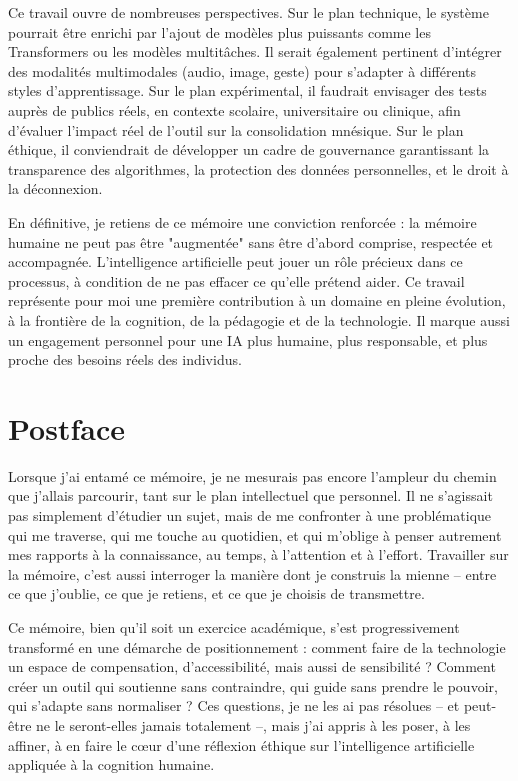 \documentclass[11pt,a4paper]{report}
\begin{document}
Ce travail ouvre de nombreuses perspectives. Sur le plan technique, le système pourrait être enrichi par l’ajout de modèles plus puissants comme les Transformers ou les modèles multitâches. Il serait également pertinent d’intégrer des modalités multimodales (audio, image, geste) pour s’adapter à différents styles d’apprentissage. Sur le plan expérimental, il faudrait envisager des tests auprès de publics réels, en contexte scolaire, universitaire ou clinique, afin d’évaluer l’impact réel de l’outil sur la consolidation mnésique. Sur le plan éthique, il conviendrait de développer un cadre de gouvernance garantissant la transparence des algorithmes, la protection des données personnelles, et le droit à la déconnexion.

En définitive, je retiens de ce mémoire une conviction renforcée : la mémoire humaine ne peut pas être "augmentée" sans être d’abord comprise, respectée et accompagnée. L’intelligence artificielle peut jouer un rôle précieux dans ce processus, à condition de ne pas effacer ce qu’elle prétend aider. Ce travail représente pour moi une première contribution à un domaine en pleine évolution, à la frontière de la cognition, de la pédagogie et de la technologie. Il marque aussi un engagement personnel pour une IA plus humaine, plus responsable, et plus proche des besoins réels des individus.

\chapter*{Postface}

Lorsque j’ai entamé ce mémoire, je ne mesurais pas encore l’ampleur du chemin que j’allais parcourir, tant sur le plan intellectuel que personnel. Il ne s’agissait pas simplement d’étudier un sujet, mais de me confronter à une problématique qui me traverse, qui me touche au quotidien, et qui m’oblige à penser autrement mes rapports à la connaissance, au temps, à l’attention et à l’effort. Travailler sur la mémoire, c’est aussi interroger la manière dont je construis la mienne – entre ce que j’oublie, ce que je retiens, et ce que je choisis de transmettre.

Ce mémoire, bien qu’il soit un exercice académique, s’est progressivement transformé en une démarche de positionnement : comment faire de la technologie un espace de compensation, d’accessibilité, mais aussi de sensibilité ? Comment créer un outil qui soutienne sans contraindre, qui guide sans prendre le pouvoir, qui s’adapte sans normaliser ? Ces questions, je ne les ai pas résolues – et peut-être ne le seront-elles jamais totalement –, mais j’ai appris à les poser, à les affiner, à en faire le cœur d’une réflexion éthique sur l’intelligence artificielle appliquée à la cognition humaine.
\end{document}
